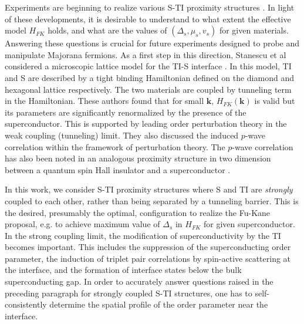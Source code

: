 \documentclass[11pt,revtex,aps]{report}
\begin{document}
Experiments are beginning to realize various S-TI proximity structures \cite{sca,march1,march2}.
In light of these developments, it is desirable to
understand to what extent the effective model $H_{FK}$ holds,
and what are the values of $(\Delta_s,\mu_s,v_s)$ for given materials. 
Answering these questions is crucial for future experiments designed to probe
and manipulate Majorana fermions. As a first step in this
direction, Stanescu et al considered a microscopic lattice model
for the TI-S interface \cite{stan}. In this model, TI and S are described by a tight binding 
Hamiltonian defined on the diamond and hexagonal lattice respectively.
The two materials are coupled by tunneling term in the Hamiltonian. 
These authors found that 
for small $\mathbf{k}$, $H_{FK}(\mathbf{k})$ is valid but its parameters are 
significantly renormalized by the presence of the superconductor. 
This is supported by leading order 
perturbation theory in the weak coupling (tunneling) limit. They also
discussed the induced $p$-wave correlation within the framework of
perturbation theory. The $p$-wave correlation has also been noted in 
an analogous proximity structure in two dimension between
a quantum spin Hall insulator and a superconductor \cite{ann}.


In this work, we consider S-TI proximity structures where 
S and TI are {\it strongly} coupled to each other, 
rather than being separated by a tunneling barrier.
This is the desired, presumably the optimal, configuration to realize the Fu-Kane
proposal, e.g. to achieve maximum value of $\Delta_s$ in $H_{FK}$ for given
superconductor. 
In the strong coupling limit, 
the modification of superconductivity by the TI becomes important.
This includes the suppression of the superconducting order parameter,
the induction of triplet pair correlations by spin-active scattering
at the interface, and the formation of interface states below the bulk superconducting gap.
In order to accurately answer questions raised in the preceding paragraph
for strongly coupled S-TI structures, one has to self-consistently 
determine the spatial profile of 
the order parameter near the interface.
\end{document}
